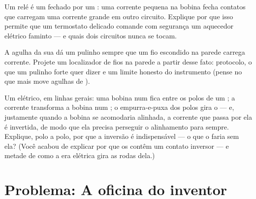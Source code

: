 \begin{exercise}[$\star\star$]\label{exo:g8:electric-current-effects:10}
Um relé é um  fechado por um : uma corrente
pequena na bobina fecha contatos que carregam uma corrente grande em
outro circuito. Explique por que isso permite que um termostato
delicado comande com segurança um aquecedor elétrico faminto --- e
quais dois circuitos nunca se tocam.
\end{exercise}

\begin{exercise}[$\star\star$]\label{exo:g8:electric-current-effects:11}
A agulha da sua  dá um pulinho sempre que um fio escondido na
parede carrega corrente. Projete um localizador de fios na parede a
partir desse fato: protocolo, o que um pulinho forte quer dizer e um
limite honesto do instrumento (pense no que mais move agulhas de
).
\end{exercise}

\begin{exercise}[$\star\star\star$]\label{exo:g8:electric-current-effects:12}
Um  elétrico, em linhas gerais: uma bobina num  fica entre
os polos de um ; a corrente transforma a bobina num ; o
empurra-e-puxa dos polos gira o  --- e, justamente quando a
bobina se acomodaria alinhada, a corrente que passa por ela é
invertida, de modo que ela precisa perseguir o alinhamento para
sempre. Explique, polo a polo, por que a inversão é indispensável ---
o que o  faria sem ela? (Você acabou de explicar por que os
 contêm um contato inversor --- e metade de como a era
elétrica gira as rodas dela.)
\end{exercise}

\section{Problema: A oficina do inventor}

